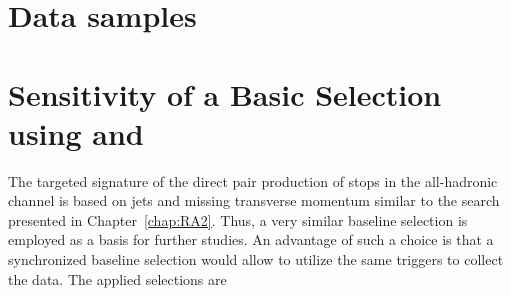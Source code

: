 \section{Data samples}
\label{sec:stop_samples}

\section{Sensitivity of a Basic Selection using \HT and \met}
\label{sec:stop_baseline}
The targeted signature of the direct pair production of stops in the all-hadronic channel is based on jets and missing transverse momentum similar to the search presented in Chapter~\ref{chap:RA2}. Thus, a very similar baseline selection is employed as a basis for further studies. An advantage of such a choice is that a synchronized baseline selection would allow to utilize the same triggers to collect the data. The applied selections are
